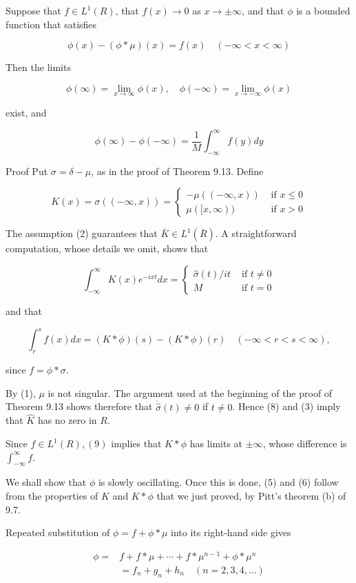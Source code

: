 \documentclass[10pt]{article}
\begin{document}
Suppose that $f \in L^{1}(R)$, that $f(x) \rightarrow 0$ as $x \rightarrow \pm \infty$, and that $\phi$ is a bounded function that satisfies

$$
\phi(x)-(\phi * \mu)(x)=f(x) \quad(-\infty<x<\infty)
$$

Then the limits

$$
\phi(\infty)=\lim _{x \rightarrow \infty} \phi(x), \quad \phi(-\infty)=\lim _{x \rightarrow-\infty} \phi(x)
$$

exist, and

$$
\phi(\infty)-\phi(-\infty)=\frac{1}{M} \int_{-\infty}^{\infty} f(y) d y
$$

Proof Put $\sigma=\delta-\mu$, as in the proof of Theorem 9.13. Define

$$
K(x)=\sigma((-\infty, x))= \begin{cases}-\mu((-\infty, x)) & \text { if } x \leq 0 \\ \mu([x, \infty)) & \text { if } x>0\end{cases}
$$

The assumption (2) guarantees that $\bar{K} \in L^{1}(\bar{R})$. A straightforward computation, whose details we omit, shows that

$$
\int_{-\infty}^{\infty} K(x) e^{-i x t} d x= \begin{cases}\hat{\sigma}(t) / i t & \text { if } t \neq 0 \\ M & \text { if } t=0\end{cases}
$$

and that

$$
\int_{r}^{s} f(x) d x=(K * \phi)(s)-(K * \phi)(r) \quad(-\infty<r<s<\infty),
$$

since $f=\phi * \sigma$.

By (1), $\mu$ is not singular. The argument used at the beginning of the proof of Theorem 9.13 shows therefore that $\dot{\hat{\sigma}}(t) \neq 0$ if $t \neq 0$. Hence (8) and (3) imply that $\hat{K}$ has no zero in $R$.

Since $f \in L^{1}(R),(9)$ implies that $K * \phi$ has limits at $\pm \infty$, whose difference is $\int_{-\infty}^{\infty} f$.

We shall show that $\phi$ is slowly oscillating. Once this is done, (5) and (6) follow from the properties of $K$ and $K * \phi$ that we just proved, by Pitt's theorem (b) of 9.7.

Repeated substitution of $\phi=f+\phi * \mu$ into its right-hand side gives

$$
\begin{aligned}
\phi= & f+f * \mu+\cdots+f * \mu^{n-1}+\phi * \mu^{n} \\
& =f_{n}+g_{n}+h_{n} \quad(n=2,3,4, \ldots)
\end{aligned}
$$
\end{document}
